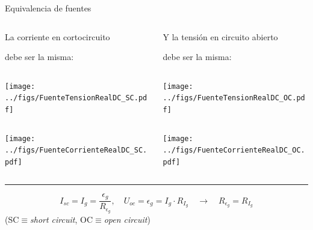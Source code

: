 \documentclass[aspectratio=169, xcolor={usenames,svgnames,dvipsnames}]{beamer}
\begin{document}

\begin{frame}{Equivalencia de fuentes}
    \vspace*{5mm}
    \begin{columns}

    \begin{column}{0.5\columnwidth}
    \centering 
    La \alert{corriente en cortocircuito} 
    
    debe ser la misma:
    
        \begin{column}{0.25\columnwidth}
            \texttt{[image: ../figs/FuenteTensionRealDC\_SC.pdf]}        
        \end{column}
        \begin{column}{0.25\columnwidth}
           \texttt{[image: ../figs/FuenteCorrienteRealDC\_SC.pdf]}           
        \end{column}       
        \hfill
    \end{column}    
    \vrule
    \begin{column}{0.5\columnwidth}
    \centering 
    Y la \alert{tensión en circuito abierto} 
    
    debe ser la misma:
    
        \begin{column}{0.25\columnwidth}
            \hspace*{6mm}\texttt{[image: ../figs/FuenteTensionRealDC\_OC.pdf]}        
        \end{column}
        \begin{column}{0.25\columnwidth}
           \texttt{[image: ../figs/FuenteCorrienteRealDC\_OC.pdf]}
        \end{column}
        \hfill
    \end{column}
    
    \end{columns}

    \vspace{4mm}
    \hrule
    \vspace{3mm}
    
    \[
        I_{sc}=I_g=\frac{\epsilon_g}{R_{\epsilon_g}} , \quad 
        U_{oc}=\epsilon_g=I_g \cdot R_{I_g} \quad \rightarrow \quad \boxed{R_{\epsilon_g} = R_{I_g}}
    \]
    \hspace*{29mm}(\small{SC$\equiv$\textit{short circuit}, \hspace*{4mm}OC$\equiv$\textit{open circuit}})

\end{frame}
\end{document}
